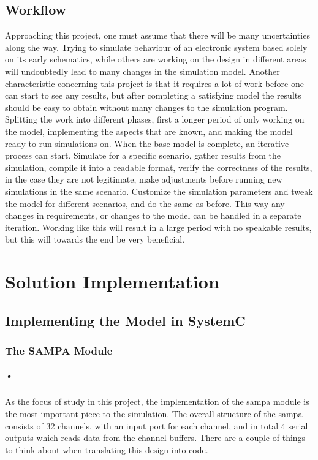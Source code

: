 \documentclass[a4paper, 12pt, openright, twoside]{report}
\begin{document}
\section{Workflow}
Approaching this project, one must assume that there will be many uncertainties along the way.
Trying to simulate behaviour of an electronic system based solely on its early schematics, while others are working on the design in different areas will undoubtedly lead to many changes in the simulation model.
Another characteristic concerning this project is that it requires a lot of work before one can start to see any results, but after completing a satisfying  model the results should be easy to obtain without many changes to the simulation program.
Splitting the work into different phases, first a longer period of only working on the model, implementing the aspects that are known, and making the model ready to run simulations on.
When the base model is complete, an iterative process can start.
Simulate for a specific scenario, gather results from the simulation, compile it into a readable format, verify the correctness of the results, in the case they are not legitimate, make adjustments before running new simulations in the same scenario.
Customize the simulation parameters and tweak the model for different scenarios, and do the same as before.
This way any changes in requirements, or changes to the model can be handled in a separate iteration.
Working like this will result in a large period with no speakable results, but this will towards the end be very beneficial.

\chapter{Solution Implementation}

\section{Implementing the Model in SystemC}

\subsection{The SAMPA Module}

\paragraph{•}
As the focus of study in this project, the implementation of the \gls{sampa} module is the most important piece to the simulation.
The overall structure of the \gls{sampa} consists of 32 channels, with an input port for each channel, and in total 4 serial outputs which reads data from the channel buffers.
There are a couple of things to think about when translating this design into code.
\end{document}
